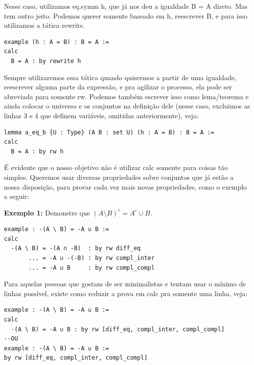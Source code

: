 Nesse caso, utilizamos {\selectfont eq.symm h}, que já nos deu a igualdade {\selectfont B = A} direto. Mas tem outro jeito. Podemos querer somente baseado em {\selectfont h}, reescrever {\selectfont B}, e para isso utilizamos a tática {\selectfont rewrite}.

\begin{lstlisting}
example (h : A = B) : B = A :=
calc
  B = A : by rewrite h \end{lstlisting}

Sempre utilizaremos essa tática quando quisermos a partir de uma igualdade, reescrever alguma parte da expressão, e pra agilizar o processo, ela pode ser abreviada para somente {\selectfont rw}.
Podemos também escrever isso como lema/teorema e ainda colocar o universo e os conjuntos na definição dele (nesse caso, excluimos as linhas $3$ e $4$ que definem variáveis, omitidas anteriormente), veja:

\begin{lstlisting}
lemma a_eq_b {U : Type} (A B : set U) (h : A = B) : B = A :=
calc
  B = A : by rw h \end{lstlisting}

É evidente que o nosso objetivo não é utilizar {\selectfont calc} somente para coisas tão simples. Queremos usar diversas propriedades sobre conjuntos que já estão a nossa disposição, para provar cada vez mais novas propriedades, como o exemplo a seguir:

\textbf{Exemplo 1:} Demonstre que $(A \setminus B)^c = A^c \cup B$.
\begin{lstlisting}
example : -(A \ B) = -A ∪ B :=
calc
  -(A \ B) = -(A ∩ -B)  : by rw diff_eq
       ... = -A ∪ -(-B) : by rw compl_inter
       ... = -A ∪ B     : by rw compl_compl \end{lstlisting}

Para aquelas pessoas que gostam de ser minimalistas e tentam usar o mínimo de linhas possível, existe como reduzir a prova em {\selectfont calc} pra somente uma linha, veja:

\begin{lstlisting}
example : -(A \ B) = -A ∪ B :=
calc
  -(A \ B) = -A ∪ B : by rw [diff_eq, compl_inter, compl_compl]
--OU
example : -(A \ B) = -A ∪ B :=
by rw [diff_eq, compl_inter, compl_compl] \end{lstlisting}


